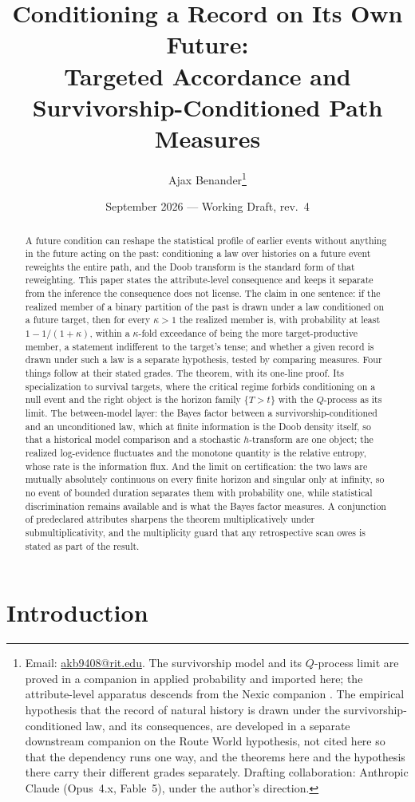 \documentclass[11pt]{article}
\title{Conditioning a Record on Its Own Future:\\ \large Targeted Accordance and Survivorship-Conditioned Path Measures}
\author{Ajax Benander\thanks{Email:
\href{mailto:akb9408@rit.edu}{akb9408@rit.edu}. The survivorship model and
its $Q$-process limit are proved in a companion in applied probability
\cite{SurvA} and imported here; the attribute-level apparatus descends from
the Nexic companion \cite{Nexus}. The empirical hypothesis that the record of
natural history is drawn under the survivorship-conditioned law, and its
consequences, are developed in a separate downstream companion on the
Route World hypothesis, not cited here so that the dependency runs one
way, and the theorems here and the hypothesis there carry their
different grades separately. Drafting collaboration: Anthropic Claude (Opus~4.x,
Fable~5), under the author's direction.}}
\date{September 2026 --- Working Draft, rev.~4}
\theoremstyle{plain}
\theoremstyle{definition}
\theoremstyle{remark}
\begin{document}
\maketitle

\begin{abstract}
A future condition can reshape the statistical profile of earlier events
without anything in the future acting on the past: conditioning a law over
histories on a future event reweights the entire path, and the Doob
transform is the standard form of that reweighting. This paper states the
attribute-level consequence and keeps it separate from the inference the
consequence does not license. The claim in one sentence: if the realized
member of a binary partition of the past is drawn under a law conditioned
on a future target, then for every $\kappa>1$ the realized member is, with
probability at least $1-1/(1+\kappa)$, within a $\kappa$-fold exceedance
of being the more target-productive member, a statement indifferent to the
target's tense; and whether a given record is drawn under such a law is a
separate hypothesis, tested by comparing measures. Four things follow at
their stated grades. The theorem, with its one-line proof. Its
specialization to survival targets, where the critical regime forbids
conditioning on a null event and the right object is the horizon family
$\{T>t\}$ with the $Q$-process as its limit. The between-model layer: the
Bayes factor between a survivorship-conditioned and an unconditioned law,
which at finite information is the Doob density itself, so that a
historical model comparison and a stochastic $h$-transform are one object;
the realized log-evidence fluctuates and the monotone quantity is the
relative entropy, whose rate is the information flux. And the limit on
certification: the two laws are mutually absolutely continuous on every
finite horizon and singular only at infinity, so no event of bounded
duration separates them with probability one, while statistical
discrimination remains available and is what the Bayes factor measures.
A conjunction of predeclared attributes sharpens the theorem
multiplicatively under submultiplicativity, and the multiplicity guard
that any retrospective scan owes is stated as part of the result.
\end{abstract}

\section{Introduction}\label{sec:intro}
\end{document}
